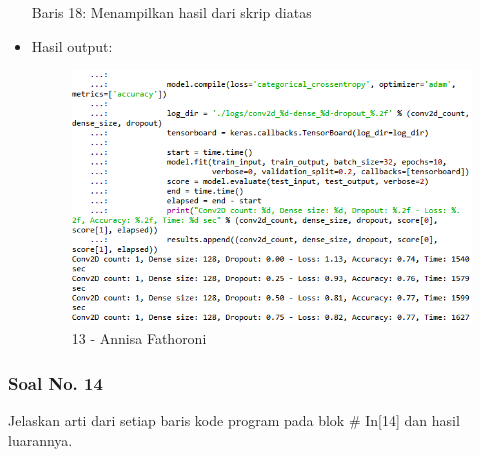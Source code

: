 \begin{itemize}
Baris 18: Menampilkan hasil dari skrip diatas

\item Hasil output:

\begin{figure}[!hbtp]
\centering
\includegraphics[scale=0.7]{figures/Chapter 7/1164067/Praktek/Chapter7AnnisaFathoroni13.png}
\caption{13 - Annisa Fathoroni}
\label{13 - Annisa Fathoroni}
\end{figure}

\end{itemize}

\subsubsection{Soal No. 14}
Jelaskan arti dari setiap baris kode program pada blok \# In[14] dan hasil luarannya.

